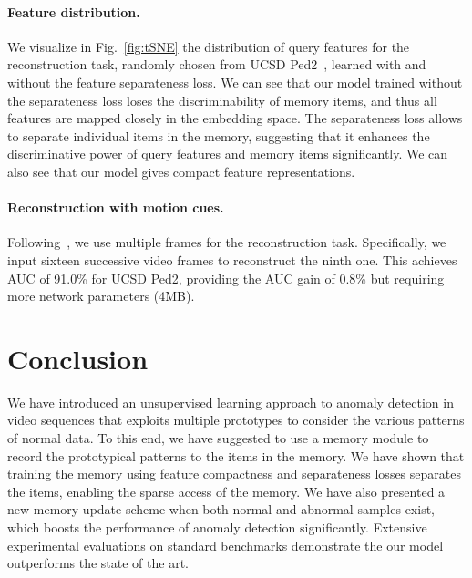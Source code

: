 \documentclass[10pt,twocolumn,letterpaper]{article}
\begin{document}
    		



		
\vspace{-0.5cm}		
		\paragraph{Feature distribution.}
		We visualize in Fig.~\ref{fig:tSNE} the distribution of query features for the reconstruction task, randomly chosen from UCSD Ped2~\cite{li2013anomaly}, learned with and without the feature separateness loss. We can see that our model trained without the separateness loss loses the discriminability of memory items, and thus all features are mapped closely in the embedding space. The separateness loss allows to separate individual items in the memory, suggesting that it enhances the discriminative power of query features and memory items significantly. We can also see that our model gives compact feature representations. 
		
		
\vspace{-0.5cm}
		\paragraph{Reconstruction with motion cues.}
Following~\cite{gong2019memorizing}, we use multiple frames for the reconstruction task. Specifically, we input sixteen successive video frames to reconstruct the ninth one. This achieves AUC of 91.0\% for UCSD Ped2, providing the AUC gain of 0.8\% but requiring more network parameters (4MB).		




\vspace{-0.2cm}   
\section{Conclusion}
\vspace{-0.1cm}   
	We have introduced an unsupervised learning approach to anomaly detection in video sequences that exploits multiple prototypes to consider the various patterns of normal data. To this end, we have suggested to use a memory module to record the prototypical patterns to the items in the memory. We have shown that training the memory using feature compactness and separateness losses separates the items, enabling the sparse access of the memory. We have also presented a new memory update scheme when both normal and abnormal samples exist, which boosts the performance of anomaly detection significantly. Extensive experimental evaluations on standard benchmarks demonstrate the our model outperforms the state of the art.
\end{document}
